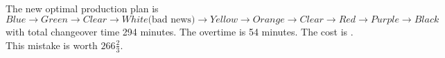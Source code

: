 \paragraph{}
The new optimal production plan is $ Blue \rightarrow Green \rightarrow Clear \rightarrow White \text{(bad news)} \rightarrow Yellow \rightarrow Orange \rightarrow Clear \rightarrow Red \rightarrow Purple \rightarrow Black $ with total changeover time 294 minutes. The overtime is 54 minutes. The cost is . This mistake is worth \texteuro $266\frac{2}{3}$.
